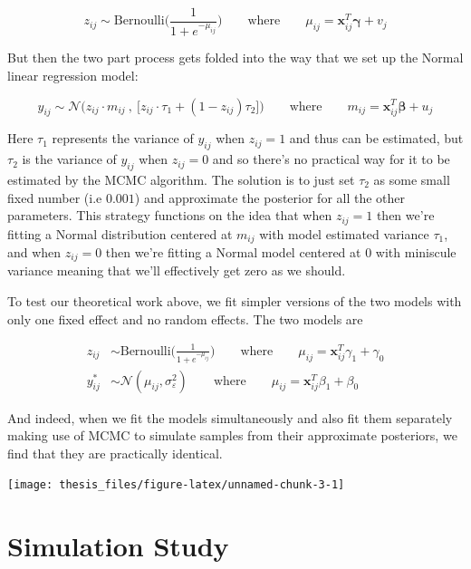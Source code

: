 \documentclass[12pt,twoside]{reedthesis}
\begin{document}
\[
z_{ij} \sim \text{Bernoulli}\Bigg(\frac{1}{1 + e^{-\mu_{ij}}}\Bigg) \qquad \text{where} \qquad \mu_{ij} =\mathbf{x}_{ij}^T\boldsymbol{\gamma} + v_j
\]

But then the two part process gets folded into the way that we set up the Normal linear regression model:

\[
y_{ij} \sim \mathcal{N}\bigg(z_{ij}\cdot m_{ij} \ , \ \Big[z_{ij}\cdot\tau_1 + (1 - z_{ij})\tau_2\Big]\bigg) \qquad \text{where} \qquad m_{ij} =\mathbf{x}_{ij}^T\boldsymbol{\beta} + u_j
\]

Here \(\tau_1\) represents the variance of \(y_{ij}\) when \(z_{ij} = 1\) and thus can be estimated, but \(\tau_2\) is the variance of \(y_{ij}\) when \(z_{ij} = 0\) and so there's no practical way for it to be estimated by the MCMC algorithm. The solution is to just set \(\tau_2\) as some small fixed number (i.e \(0.001\)) and approximate the posterior for all the other parameters. This strategy functions on the idea that when \(z_{ij} = 1\) then we're fitting a Normal distribution centered at \(m_{ij}\) with model estimated variance \(\tau_1\), and when \(z_{ij} = 0\) then we're fitting a Normal model centered at 0 with miniscule variance meaning that we'll effectively get zero as we should.

To test our theoretical work above, we fit simpler versions of the two models with only one fixed effect and no random effects. The two models are

\[
\begin{aligned}
z_{ij} &\sim \text{Bernoulli}\Bigg(\frac{1}{1 + e^{-\mu_{ij}}}\Bigg) \qquad \text{where} \qquad \mu_{ij} =\mathbf{x}_{ij}^T\gamma_1 + \gamma_0  \\
y^*_{ij} &\sim \mathcal{N}(\mu_{ij}, \sigma_{\varepsilon}^2) \qquad \text{where} \qquad \mu_{ij} = \mathbf{x}_{ij}^T\beta_1 + \beta_0 
\end{aligned}
\]

And indeed, when we fit the models simultaneously and also fit them separately making use of MCMC to simulate samples from their approximate posteriors, we find that they are practically identical.
\begin{center}\texttt{[image: thesis\_files/figure-latex/unnamed-chunk-3-1]} \end{center}

\hypertarget{sim-study}{%
\chapter{Simulation Study}\label{sim-study}}
\end{document}
